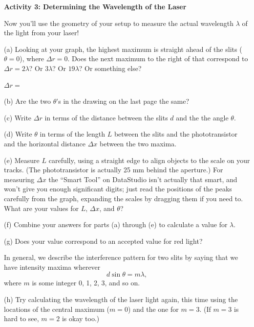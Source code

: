 \pagebreak[2]
\textbf{Activity 3: Determining the Wavelength of the Laser }

Now you'll use the geometry of your setup to measure the actual wavelength $\lambda$ of the light from your laser!

(a) Looking at your graph, the highest maximum is straight ahead of the slits ($\theta=0$), where $\Delta r=0$.  Does the next maximum to the right of that correspond to $\Delta r=2\lambda$?  Or $3\lambda$?  Or $19\lambda$?  Or something else?

\vspace{0.1in}
\hspace{0.8in}$\Delta r=$
\vspace{0.1in}

(b) Are the two $\theta$'s in the drawing on the last page the same?
\answerspace{0.3in}

(c) Write $\Delta r$ in terms of the distance between the slits $d$ and the the angle $\theta$.
\answerspace{0.5in}

(d) Write $\theta$ in terms of the length $L$ between the slits and the phototransistor and the horizontal distance $\Delta x$ between the two maxima.
\answerspace{0.5in}

(e) Measure $L$ carefully, using a straight edge to align objects to the scale on your tracks.  (The phototransistor is actually 25 mm behind the aperture.)  For measuring $\Delta x$ the ``Smart Tool'' on DataStudio isn't actually that smart, and won't give you enough significant digits; just read the positions of the peaks carefully from the graph, expanding the scales by dragging them if you need to.  What are your values for $L$, $\Delta x$, and $\theta$?
\answerspace{0.8in}

(f) Combine your answers for parts (a) through (e) to calculate a value for $\lambda$.  
\answerspace{1in}

(g) Does your value correspond to an accepted value for red light?
\answerspace{0.3in}

In general, we describe the interference pattern for two slits by saying that we have intensity maxima wherever 
\begin{displaymath}
d \sin \theta = m \lambda,
\end{displaymath}
where $m$ is some integer 0, 1, 2, 3, and so on.  

(h) Try calculating the wavelength of the laser light again, this time using the locations of the central maximum ($m=0$) and the one for $m=3$.  (If $m=3$ is hard to see, $m=2$ is okay too.)
\answerspace{1.0in}


